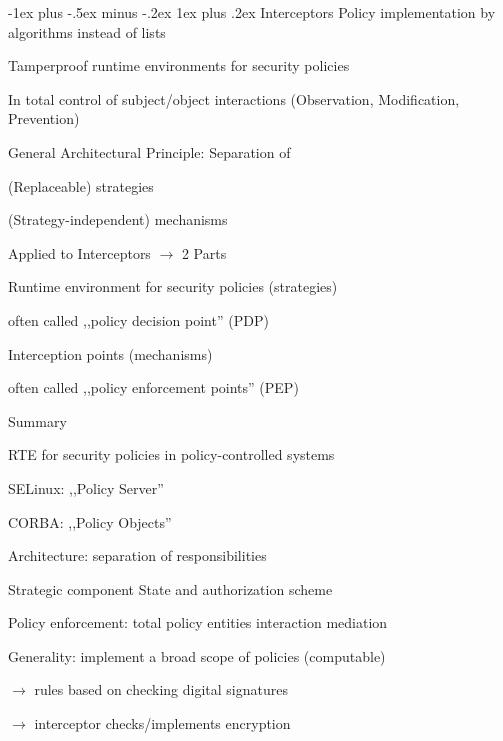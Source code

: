 \documentclass[a4paper]{article}
\makeatletter
\renewcommand{\subsubsection}{\@startsection{subsubsection}{3}{0mm}%
                {-1ex plus -.5ex minus -.2ex}%
                {1ex plus .2ex}%
                {\normalfont\small\bfseries}}
\makeatother
\begin{document}
\begin{multicols}{3}
    \subsubsection{Interceptors}
    Policy implementation by algorithms instead of lists
    \begin{itemize*}
        \item Tamperproof runtime environments for security policies
        \item In total control of subject/object interactions (Observation, Modification, Prevention)
    \end{itemize*}

    General Architectural Principle: Separation of
    \begin{itemize*}
        \item (Replaceable) strategies
        \item (Strategy-independent) mechanisms
    \end{itemize*}

    Applied to Interceptors $\rightarrow$ 2 Parts
    \begin{itemize*}
        \item Runtime environment for security policies (strategies)
        \begin{itemize*}
            \item often called ,,policy decision point'' (PDP)
        \end{itemize*}
        \item Interception points (mechanisms)
        \begin{itemize*}
            \item often called ,,policy enforcement points'' (PEP)
        \end{itemize*}
    \end{itemize*}

    Summary
    \begin{itemize*}
        \item RTE for security policies in policy-controlled systems
        \begin{itemize*}
            \item SELinux: ,,Policy Server''
            \item CORBA: ,,Policy Objects''
        \end{itemize*}
        \item Architecture: separation of responsibilities
        \item Strategic component State and authorization scheme
        \item Policy enforcement: total policy entities interaction mediation
        \item Generality: implement a broad scope of policies (computable)
        \begin{itemize*}
            \item[$\rightarrow$] rules based on checking digital signatures
            \item[$\rightarrow$] interceptor checks/implements encryption
        \end{itemize*}
    \end{itemize*}


\end{multicols}
\end{document}
